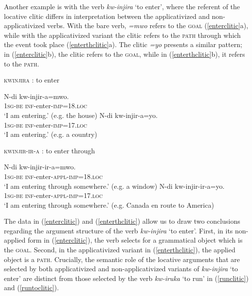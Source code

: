 \documentclass[output=paper]{langsci/langscibook}
\begin{document}
Another example is with the verb \emph{kw-injira} `to enter', where the referent of the locative clitic differs in interpretation between the applicativized and non-applicativized verbs. With the bare verb, \emph{=mwo} refers to the {\scshape goal} (\ref{enterclitic}a), while with the applicativized variant the clitic refers to the {\scshape path} through which the event took place (\ref{enterthclitic}a). The clitic \emph{=yo} presents a similar pattern; in (\ref{enterclitic}b), the clitic refers to the {\scshape goal}, while in (\ref{enterthclitic}b), it refers to the {\scshape path}.

  


\begin{exe}
      \ex\label{enterclitic} {\scshape kwinjira} : to enter \begin{xlist}
	      \ex\gll N-di kw-injir-a=mwo.\\
			      1{\scshape sg-be} {\scshape inf-}enter-{\scshape imp=18.loc}\\
			      \glt `I am entering.' (e.g. the house)
	      \ex\gll N-di kw-injir-a=yo.\\
			      1{\scshape sg-be} {\scshape inf-}enter-{\scshape imp=17.loc}\\
			      \glt `I am entering.' (e.g. a country)
      \end{xlist}
      \ex\label{enterthclitic} {\scshape kwinjir-ir-a} : to enter through \begin{xlist}
	      \ex\gll N-di kw-injir-ir-a=mwo.\\
			      1{\scshape sg-be} {\scshape inf-}enter-{\scshape appl-imp=18.loc}\\
			      \glt `I am entering through somewhere.' (e.g. a window)
	      \ex\gll N-di kw-injir-ir-a=yo.\\
			      1{\scshape sg-be} {\scshape inf-}enter-{\scshape appl-imp=17.loc}\\
			      \glt `I am entering through somewhere.' (e.g. Canada en route to America)
	      \end{xlist}
	      \end{exe}
%
The data in (\ref{enterclitic}) and (\ref{enterthclitic}) allow us to draw two conclusions regarding the argument structure of the verb \emph{kw-injira} `to enter'. First, in its non-applied form in (\ref{enterclitic}), the verb selects for a grammatical object which is the {\scshape goal}. Second, in the applicativized variant in (\ref{enterthclitic}), the applied object is a {\scshape path}. Crucially, the semantic role of the locative arguments that are selected by both applicativized and  non-applicativized variants of \emph{kw-injira} `to enter' are distinct from those selected by the verb \emph{kw-iruka} `to run' in (\ref{runclitic}) and (\ref{runtoclitic}). 
\end{document}
